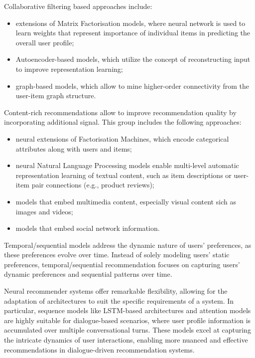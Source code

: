 Collaborative filtering based approaches include: 

\begin{itemize}
    \item extensions of Matrix Factorisation models, where neural network is used to learn weights that represent importance of individual items in predicting the overall user profile;
    \item Autoencoder-based models, which utilize the concept of reconstructing input to improve representation learning;
    \item graph-based models, which allow to mine higher-order connectivity from the user-item graph structure.
\end{itemize}

Content-rich recommendations allow to improve recommendation quality by incorporating additional signal. This group includes the following approaches:

\begin{itemize}
    \item neural extensions of Factorisation Machines, which encode categorical attributes along with users and items;
    \item  neural Natural Language Processing models enable multi-level automatic representation learning of textual content, such as item descriptions or user-item pair connections (e.g., product reviews);
    \item models that embed multimedia content, especially visual content sich as images and videos;
    \item models that embed social network information.
\end{itemize}

Temporal/sequential models address the dynamic nature of users' preferences, as these preferences evolve over time. Instead of solely modeling users' static preferences, temporal/sequential recommendation focuses on capturing users' dynamic preferences and sequential patterns over time.

Neural recommender systems offer remarkable flexibility, allowing for the adaptation of architectures to suit the specific requirements of a system. In particular, sequence models like LSTM-based architectures and attention models are highly suitable for dialogue-based scenarios, where user profile information is accumulated over multiple conversational turns. These models excel at capturing the intricate dynamics of user interactions, enabling more nuanced and effective recommendations in dialogue-driven recommendation systems.
